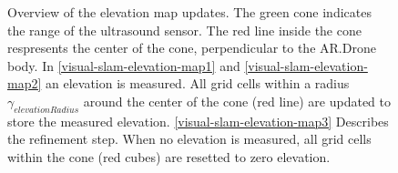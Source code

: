 \begin{figure}[htb!]
  \begin{center}
\advance\leftskip-2.5cm\rightskip-2.5cm
 \end{center}
  \caption{Overview of the elevation map updates. The green cone indicates the range of the ultrasound sensor. The red line inside the cone respresents the center of the cone, perpendicular to the AR.Drone body. In \ref{visual-slam-elevation-map1} and \ref{visual-slam-elevation-map2} an elevation is measured. All grid cells within a radius $\gamma_{elevationRadius}$ around the center of the cone (red line) are updated to store the measured elevation. \ref{visual-slam-elevation-map3} Describes the refinement step. When no elevation is measured, all grid cells within the cone (red cubes) are resetted to zero elevation.}
  \label{visual-slam-elevation-map}
\end{figure}